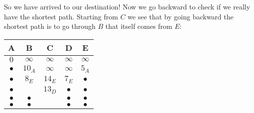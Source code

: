 	So we have arrived to our destination! Now we go backward to check if we really have the shortest path. Starting from $C$ we see that by going backward the shortest path is to go through $B$ that itself comes from $E$:
	\vspace{7mm}
	\begin{center}
	\begin{tabular}{|c|c|c|c|c|} \hline
	A & B & C & D & E \\ \hline
	$0$ & $\infty$ & $\infty$ & $\infty$ & $\infty$ \\ 
	$\bullet $ & $10_A$ & $\infty$ & $\infty$ & $5_A$ \\ 
	$\bullet $ & $8_E$ & $14_E$ & $7_E$ & $\bullet $\\ 
	$\bullet $ & \fbox{$8_E$} & $13_D$ & $\bullet$ & $\bullet $\\ 
	$\bullet$  & $\bullet$ &  & $\bullet$ & $\bullet$ \\ 
	$\bullet$  & $\bullet$ &  & $\bullet$ & $\bullet$ \\ 
	\end{tabular}
	\end{center}
	
